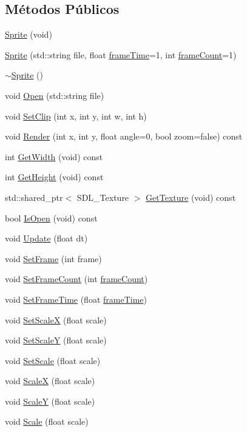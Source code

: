 \subsection*{Métodos Públicos}
\begin{DoxyCompactItemize}
\item 
\hyperlink{classSprite_abee3d268d8e467d9e23bfe0693e64144}{Sprite} (void)
\item 
\hyperlink{classSprite_a5b32e7b8aede63b8a2720ecfa670d0e3}{Sprite} (std\+::string file, float \hyperlink{classSprite_a5d41b63da1b5ee4a734ce060ab876878}{frame\+Time}=1, int \hyperlink{classSprite_a8dc8d5c9530bad6113d37fe5e53e4668}{frame\+Count}=1)
\item 
\hyperlink{classSprite_a8accab430f9d90ae5117b57d67e32b84}{$\sim$\+Sprite} ()
\item 
void \hyperlink{classSprite_a0528ea8ae39cdf864e01e2b4aaca8dca}{Open} (std\+::string file)
\item 
void \hyperlink{classSprite_a3ad46a400f83d41eaba2c2df77e0cf7c}{Set\+Clip} (int x, int y, int w, int h)
\item 
void \hyperlink{classSprite_a42afe1ad83085fb323e388f5854d9b01}{Render} (int x, int y, float angle=0, bool zoom=false) const 
\item 
int \hyperlink{classSprite_ad3d43826d2f41185964ec4a1eb492248}{Get\+Width} (void) const 
\item 
int \hyperlink{classSprite_a2a5a7c73dd94f822b0a248de3621e5eb}{Get\+Height} (void) const 
\item 
std\+::shared\+\_\+ptr$<$ S\+D\+L\+\_\+\+Texture $>$ \hyperlink{classSprite_a27148c9990eeb0efa187ec41de2d3db0}{Get\+Texture} (void) const 
\item 
bool \hyperlink{classSprite_a9f1e62573dd91cb03dbad7aa54807b8c}{Is\+Open} (void) const 
\item 
void \hyperlink{classSprite_a1f5ac7fbd3e6efeca11cedb6b822df43}{Update} (float dt)
\item 
void \hyperlink{classSprite_a351dd54dac6cadbbdec48f9e1d8a36c0}{Set\+Frame} (int frame)
\item 
void \hyperlink{classSprite_adf5254476a027570a0112cf48979f3a5}{Set\+Frame\+Count} (int \hyperlink{classSprite_a8dc8d5c9530bad6113d37fe5e53e4668}{frame\+Count})
\item 
void \hyperlink{classSprite_a8ebb93cd7485a51ccc635819ded6349b}{Set\+Frame\+Time} (float \hyperlink{classSprite_a5d41b63da1b5ee4a734ce060ab876878}{frame\+Time})
\item 
void \hyperlink{classSprite_aad7bb29fc017ac2197dffec177c17e15}{Set\+Scale\+X} (float scale)
\item 
void \hyperlink{classSprite_a2853ee7687dc906b9be791d197a1b1b6}{Set\+Scale\+Y} (float scale)
\item 
void \hyperlink{classSprite_a54d18a18383575b04f397f5bec3113d0}{Set\+Scale} (float scale)
\item 
void \hyperlink{classSprite_a42b3a6ed82560c5b97085cc127984cf4}{Scale\+X} (float scale)
\item 
void \hyperlink{classSprite_ad4a9b4df6061cf7391403a4d03286ff0}{Scale\+Y} (float scale)
\item 
void \hyperlink{classSprite_aa8b31cd4deebedbbdf8ca3923a3064c6}{Scale} (float scale)
\end{DoxyCompactItemize}
